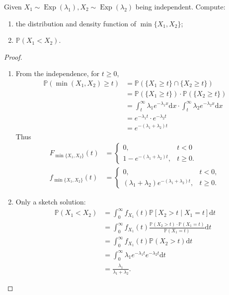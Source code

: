 \documentclass[11pt,singlecolumn, openany, citestyle=authoryear]{elegantbook}
\begin{document}
\begin{CJK}{UTF8}{gbsn}
\begin{exercise}
    Given $X_1 \sim \operatorname{Exp}(\lambda_1), X_2 \sim \operatorname{Exp}(\lambda_2)$
    being independent. Compute:
    \begin{enumerate}
        \item the distribution and density function of $\min\{X_1,X_2\}$;
        \item $\mathbb{P}(X_1<X_2)$.
    \end{enumerate}
\end{exercise}
\begin{proof}
    \begin{enumerate}
        \item From the independence, for $t\geqslant 0$,
        \begin{align*}
            \mathbb{P}(\min(X_1,X_2)\geqslant t)&= \mathbb{P}(\{X_1\geqslant t\}
            \cap \{X_2\geqslant t\})\\
            &=\mathbb{P}(\{X_1\geqslant t\})\cdot \mathbb{P}(\{X_2\geqslant t\})\\
            &=\int^{\infty}_t \lambda_1e^{-\lambda_1x}\mathrm{d}x 
            \cdot \int^{\infty}_t \lambda_2e^{-\lambda_2x}\mathrm{d}x \\
            &=e^{-\lambda_1t} \cdot e^{-\lambda_2t}\\
            &=e^{-(\lambda_1+\lambda_2)t}
        \end{align*}
        Thus 
        \begin{align*}
        F_{\min\{X_1,X_2\}}(t)&=
        \begin{cases}
            0, & t < 0\\
            1-e^{-(\lambda_1+\lambda_2)t}, & t\geqslant 0.
        \end{cases}\\
        f_{\min\{X_1,X_2\}}(t)&=
        \begin{cases}
            0, &t<0,\\
            (\lambda_1+\lambda_2)e^{-(\lambda_1+\lambda_2)t},&t\geqslant 0.
        \end{cases}
    \end{align*}
        \item Only a sketch solution:
        \begin{align*}
            \mathbb{P}(X_1<X_2)&= \int_0^\infty f_{X_1}(t)\mathbb{P}[X_2>t\mid X_1=t]\mathrm{d}t \\
            &=\int_0^\infty f_{X_1}(t)\frac{\mathbb{P}(X_2>t)\cdot \mathbb{P}(X_1=t)}{\mathbb{P}(X_1=t)}\mathrm{d}t\\
            &=\int_0^\infty f_{X_1}(t)\mathbb{P}(X_2>t)\mathrm{d}t\\
            &=\int_0^\infty \lambda_1 e^{-\lambda_1t}e^{-\lambda_2t}\mathrm{d}t\\
            &=\frac{\lambda_1}{\lambda_1+\lambda_2}.
        \end{align*}
    \end{enumerate}
\end{proof}


\end{CJK}
\end{document}
